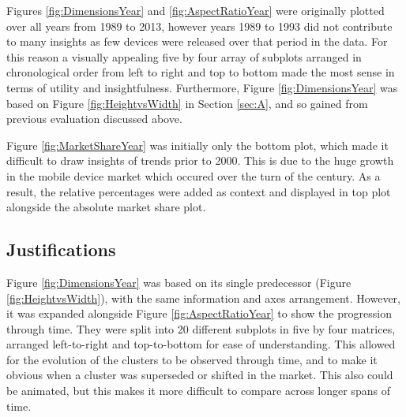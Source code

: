 \documentclass[conference]{IEEEtran}
\begin{document}
Figures \ref{fig:DimensionsYear} and \ref{fig:AspectRatioYear} were
originally plotted over all years from 1989 to 2013, however years 1989 to 1993
did not contribute to many insights as few devices were released over that
period in the data. For this reason a visually appealing five by four array of
subplots arranged in chronological order from left to right and top to bottom
made the most sense in terms of utility and insightfulness. Furthermore,
Figure \ref{fig:DimensionsYear} was based on Figure \ref{fig:HeightvsWidth} in
Section \ref{sec:A}, and so gained from previous evaluation discussed above.


Figure \ref{fig:MarketShareYear} was initially only the bottom plot, which
made it difficult to draw insights of trends prior to 2000. This is due to the
huge growth in the mobile device market which occured over the turn of the
century. As a result, the relative percentages were added as context and
displayed in top plot alongside the absolute market share plot.


\subsection{Justifications}

Figure \ref{fig:DimensionsYear}
was based on its single predecessor (Figure \ref{fig:HeightvsWidth}), with the
same information and axes arrangement.
However, it was expanded alongside
Figure \ref{fig:AspectRatioYear}
to show the progression through time. They were split into 20 different
subplots in five by four matrices, arranged left-to-right and top-to-bottom for ease of
understanding. This allowed for the evolution of the clusters to be observed
through time, and to make it obvious when a cluster was superseded or shifted in
the market. This also could be animated, but this makes it more difficult to
compare across longer spans of time.
\end{document}
